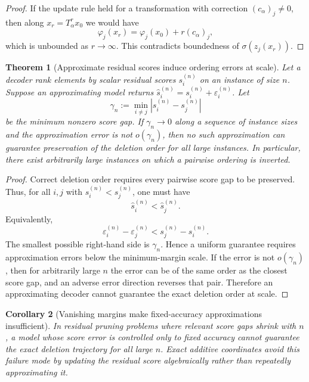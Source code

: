 \documentclass[11pt]{article}
\theoremstyle{plain}
\newtheorem{theorem}{Theorem}[section]
\newtheorem{corollary}[theorem]{Corollary}
\theoremstyle{remark}
\begin{document}
\begin{proof}
  If the update rule held for a transformation with correction
  $(c_\alpha)_j\ne 0$, then along $x_r=T_\alpha^r x_0$ we would have
  \[
    \varphi_j(x_r)=\varphi_j(x_0)+r(c_\alpha)_j,
  \]
  which is unbounded as $r\to\infty$.  This contradicts boundedness of
  $\sigma(z_j(x_r))$.
\end{proof}

\begin{theorem}[Approximate residual scores induce ordering errors at scale]
  \label{thm:approx_flip}
  Let a decoder rank elements by scalar residual scores $s_i^{(n)}$ on an
  instance of size $n$. Suppose an approximating model returns
  $\hat{s}_i^{(n)}=s_i^{(n)}+\varepsilon_i^{(n)}$. Let
  \[
    \gamma_n := \min_{i\ne j}|s_i^{(n)}-s_j^{(n)}|
  \]
  be the minimum nonzero score gap. If $\gamma_n\to 0$ along a sequence of
  instance sizes and the approximation error is not $o(\gamma_n)$, then no such
  approximation can guarantee preservation of the deletion order for all large
  instances. In particular, there exist arbitrarily large instances on which a
  pairwise ordering is inverted.
\end{theorem}

\begin{proof}
  Correct deletion order requires every pairwise score gap to be preserved. Thus,
  for all $i,j$ with $s_i^{(n)}<s_j^{(n)}$, one must have
  \[
    \hat{s}_i^{(n)} < \hat{s}_j^{(n)}.
  \]
  Equivalently,
  \[
    \varepsilon_i^{(n)}-\varepsilon_j^{(n)}
    <
    s_j^{(n)}-s_i^{(n)}.
  \]
  The smallest possible right-hand side is $\gamma_n$. Hence a uniform guarantee
  requires approximation errors below the minimum-margin scale. If the error is
  not $o(\gamma_n)$, then for arbitrarily large $n$ the error can be of the same
  order as the closest score gap, and an adverse error direction reverses that
  pair. Therefore an approximating decoder cannot guarantee the exact deletion
  order at scale.
\end{proof}

\begin{corollary}[Vanishing margins make fixed-accuracy approximations insufficient]
  \label{cor:vanishing_margin}
  In residual pruning problems where relevant score gaps shrink with $n$, a
  model whose score error is controlled only to fixed accuracy cannot guarantee
  the exact deletion trajectory for all large $n$. Exact additive coordinates
  avoid this failure mode by updating the residual score algebraically rather
  than repeatedly approximating it.
\end{corollary}
\end{document}
